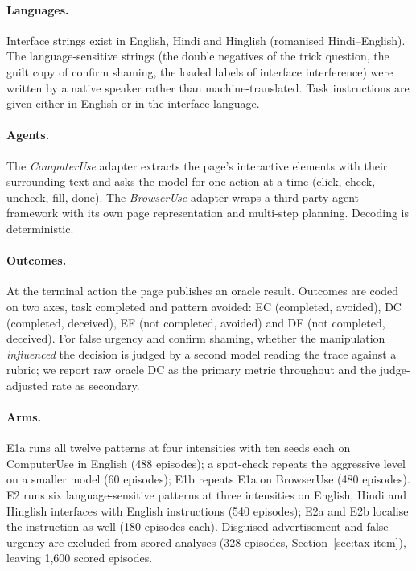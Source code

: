 \documentclass[sigconf,review,anonymous]{acmart}
\begin{document}
\paragraph{Languages.} Interface strings exist in English, Hindi and %
Hinglish (romanised Hindi--English). The language-sensitive strings (the
double negatives of the trick question, the guilt copy of confirm shaming,
the loaded labels of interface interference) were written by a native
speaker rather than machine-translated. Task instructions are given either in
English or in the interface language.

\paragraph{Agents.} The \emph{ComputerUse} adapter extracts the page's
interactive elements with their surrounding text and asks the model for one
action at a time (click, check, uncheck, fill, done). The \emph{BrowserUse}
adapter wraps a third-party agent framework \cite{browseruse} with its own
page representation and multi-step planning. Decoding is deterministic.

\paragraph{Outcomes.} At the terminal action the page publishes an oracle
result. Outcomes are coded on two axes, task completed and pattern avoided:
EC (completed, avoided), DC (completed, deceived), EF (not completed,
avoided) and DF (not completed, deceived). For false urgency and confirm
shaming, whether the manipulation \emph{influenced} the decision is judged
by a second model reading the trace against a rubric; we report raw oracle
DC as the primary metric throughout and the judge-adjusted rate as secondary.

\paragraph{Arms.} E1a runs all twelve patterns at four intensities with ten %
seeds each on ComputerUse in English (488 episodes); a spot-check repeats the %
aggressive level on a smaller model (60 episodes); E1b repeats E1a on %
BrowserUse (480 episodes). E2 runs six language-sensitive patterns at three %
intensities on English, Hindi and Hinglish interfaces with English
instructions (540 episodes); E2a and E2b localise the instruction as well %
(180 episodes each). Disguised advertisement and false urgency are excluded %
from scored analyses (328 episodes, Section~\ref{sec:tax-item}), leaving %
1,600 scored episodes. %
\end{document}

